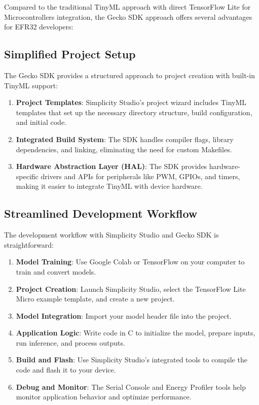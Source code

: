 \documentclass[
  9pt,
  letterpaper,
  abstract,
  titlepage]{scrbook}
\begin{document}
Compared to the traditional TinyML approach with direct TensorFlow Lite
for Microcontrollers integration, the Gecko SDK approach offers several
advantages for EFR32 developers:

\subsection{Simplified Project Setup}\label{simplified-project-setup}

The Gecko SDK provides a structured approach to project creation with
built-in TinyML support:

\begin{enumerate}
\def\labelenumi{\arabic{enumi}.}
\item
  \textbf{Project Templates}: Simplicity Studio's project wizard
  includes TinyML templates that set up the necessary directory
  structure, build configuration, and initial code.
\item
  \textbf{Integrated Build System}: The SDK handles compiler flags,
  library dependencies, and linking, eliminating the need for custom
  Makefiles.
\item
  \textbf{Hardware Abstraction Layer (HAL)}: The SDK provides
  hardware-specific drivers and APIs for peripherals like PWM, GPIOs,
  and timers, making it easier to integrate TinyML with device hardware.
\end{enumerate}

\subsection{Streamlined Development
Workflow}\label{streamlined-development-workflow}

The development workflow with Simplicity Studio and Gecko SDK is
straightforward:

\begin{enumerate}
\def\labelenumi{\arabic{enumi}.}
\item
  \textbf{Model Training}: Use Google Colab or TensorFlow on your
  computer to train and convert models.
\item
  \textbf{Project Creation}: Launch Simplicity Studio, select the
  TensorFlow Lite Micro example template, and create a new project.
\item
  \textbf{Model Integration}: Import your model header file into the
  project.
\item
  \textbf{Application Logic}: Write code in C to initialize the model,
  prepare inputs, run inference, and process outputs.
\item
  \textbf{Build and Flash}: Use Simplicity Studio's integrated tools to
  compile the code and flash it to your device.
\item
  \textbf{Debug and Monitor}: The Serial Console and Energy Profiler
  tools help monitor application behavior and optimize performance.
\end{enumerate}
\end{document}
